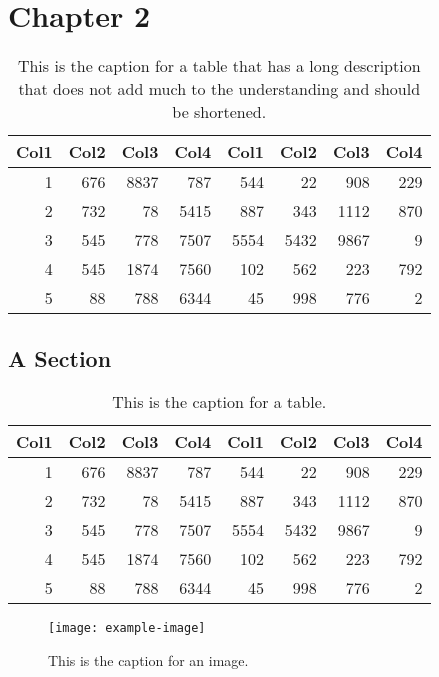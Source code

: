 \chapter{Chapter 2}
\lipsum[1]
\begin{table}
	\centering
	\begin{tabular}{r r r r r r r r}
		Col1 & Col2 & Col3 & Col4 & Col1 & Col2 & Col3 & Col4 \\
		\hline
		1    & 676  & 8837 & 787  & 544  & 22   & 908  & 229  \\
		2    & 732  & 78   & 5415 & 887  & 343  & 1112 & 870  \\
		3    & 545  & 778  & 7507 & 5554 & 5432 & 9867 & 9    \\
		4    & 545  & 1874 & 7560 & 102  & 562  & 223  & 792  \\
		5    & 88   & 788  & 6344 & 45   & 998  & 776  & 2    \\
		\hline
	\end{tabular}
	\caption{This is the caption for a table that has a long description that does not add much to the understanding and should be shortened.}
\end{table}
\lipsum[2]

\section{A Section}
\lipsum[3]
\begin{table}
	\centering
	\begin{tabular}{r r r r r r r r}
		Col1 & Col2 & Col3 & Col4 & Col1 & Col2 & Col3 & Col4 \\
		\hline
		1    & 676  & 8837 & 787  & 544  & 22   & 908  & 229  \\
		2    & 732  & 78   & 5415 & 887  & 343  & 1112 & 870  \\
		3    & 545  & 778  & 7507 & 5554 & 5432 & 9867 & 9    \\
		4    & 545  & 1874 & 7560 & 102  & 562  & 223  & 792  \\
		5    & 88   & 788  & 6344 & 45   & 998  & 776  & 2    \\
		\hline
	\end{tabular}
	\caption{This is the caption for a table.}
\end{table}
\lipsum[4-5]
\begin{figure}
	\centering
	\texttt{[image: example-image]}
	\caption{This is the caption for an image.}
\end{figure}

